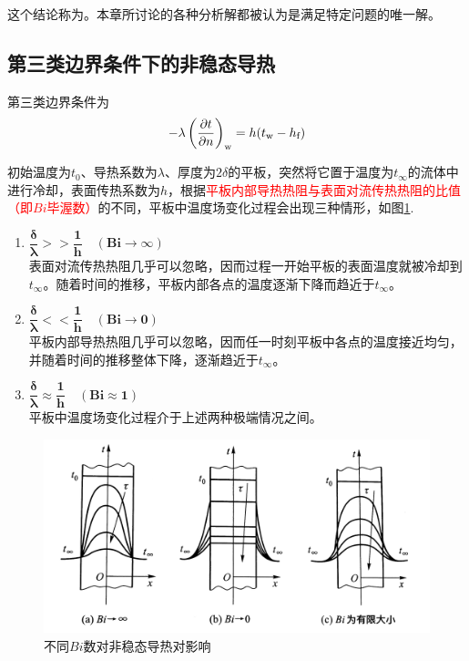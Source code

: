 这个结论称为。本章所讨论的各种分析解都被认为是满足特定问题的唯一解。
\vspace*{0.5em}

\subsection{第三类边界条件下的非稳态导热}
第三类边界条件为
\begin{equation}
	- \lambda \left(\dfrac{\partial t}{\partial n}\right)_{\text{w}} = h(t_{\text{w}} - h_{\text{f}})
\end{equation}

初始温度为$t_0$、导热系数为$\lambda$、厚度为$2\delta$的平板，突然将它置于温度为$t_\infty$的流体中进行冷却，表面传热系数为$h$，根据\textcolor{red}{平板内部导热热阻与表面对流传热热阻的比值（即$Bi$毕渥数）}的不同，平板中温度场变化过程会出现三种情形，如图\ref{Bi}.

\begin{enumerate}[1.]
	\item $\bm{\dfrac{\delta}{\lambda} >> \dfrac{1}{h} \quad(Bi \to \infty)}$\\[0.5em]
	\hspace*{2em}表面对流传热热阻几乎可以忽略，因而过程一开始平板的表面温度就被冷却到$t_\infty$。随着时间的推移，平板内部各点的温度逐渐下降而趋近于$t_\infty$。
	\vspace*{1em}
	
	\item $\bm{\dfrac{\delta}{\lambda} << \dfrac{1}{h} \quad(Bi \to 0)}$\\[0.5em]
	\hspace*{2em}平板内部导热热阻几乎可以忽略，因而任一时刻平板中各点的温度接近均匀，并随着时间的推移整体下降，逐渐趋近于$t_\infty$。
	\vspace*{1em}
	
	\item $\bm{\dfrac{\delta}{\lambda} \approx \dfrac{1}{h} \quad(Bi \approx 1)}$\\[0.5em]
	\hspace*{2em}平板中温度场变化过程介于上述两种极端情况之间。
	
\end{enumerate}
\begin{figure}[!htb]
	\centering
	\includegraphics[width=0.7\linewidth]{pic/Bi.png}
	\vspace*{-1em}
	\caption{不同$Bi$数对非稳态导热对影响}
	\label{Bi}
\end{figure}


